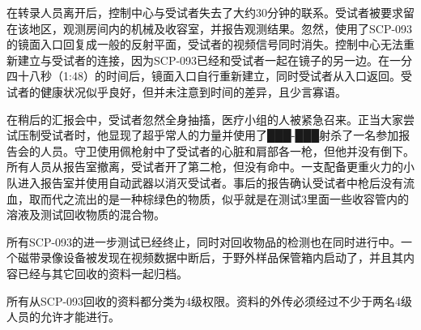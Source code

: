 在转录人员离开后，控制中心与受试者失去了大约30分钟的联系。受试者被要求留在该地区，观测房间内的机械及收容室，并报告观测结果。忽然，使用了SCP-093的镜面入口回复成一般的反射平面，受试者的视频信号同时消失。控制中心无法重新建立与受试者的连接，因为SCP-093已经和受试者一起在镜子的另一边。在一分四十八秒（1:48）的时间后，镜面入口自行重新建立，同时受试者从入口返回。受试者的健康状况似乎良好，但并未注意到时间的差异，且少言寡语。

在稍后的汇报会中，受试者忽然全身抽搐，医疗小组的人被紧急召来。正当大家尝试压制受试者时，他显现了超乎常人的力量并使用了███-███射杀了一名参加报告会的人员。守卫使用佩枪射中了受试者的心脏和肩部各一枪，但他并没有倒下。所有人员从报告室撤离，受试者开了第二枪，但没有命中。一支配备更重火力的小队进入报告室并使用自动武器以消灭受试者。事后的报告确认受试者中枪后没有流血，取而代之流出的是一种棕绿色的物质，似乎就是在测试3里面一些收容管内的溶液及测试回收物质的混合物。

所有SCP-093的进一步测试已经终止，同时对回收物品的检测也在同时进行中。一个磁带录像设备被发现在视频数据中断后，于野外样品保管箱内启动了，并且其内容已经与其它回收的资料一起归档。

所有从SCP-093回收的资料都分类为4级权限。资料的外传必须经过不少于两名4级人员的允许才能进行。

